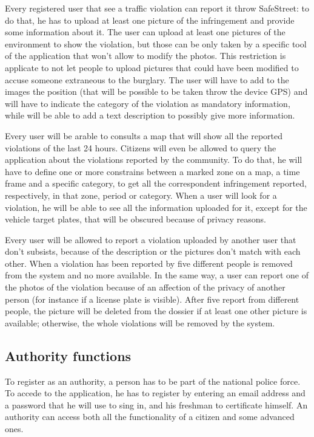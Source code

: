 \documentclass[../RASD.tex]{subfiles}
\begin{document}
    Every registered user that see a traffic violation can report it throw SafeStreet: to do that, he has to upload at least one picture of the infringement and provide some information about it. The user can upload at least one pictures of the environment to show the violation, but those can be only taken by a specific tool of the application that won't allow to modify the photos. This restriction is applicate to not let people to upload pictures that could have been modified to accuse someone extraneous to the burglary. The user will have to add to the images the position (that will be possible to be taken throw the device GPS) and will have to indicate the category of the violation as mandatory information, while will be able to add a text description to possibly give more information.

    Every user will be arable to consults a map that will show all the reported violations of the last 24 hours. Citizens will even be allowed to query the application about the violations reported by the community. To do that, he will have to define one or more constrains between a marked zone on a map, a time frame and a specific category, to get all the correspondent infringement reported, respectively, in that zone, period or category. When a user will look for a violation, he will be able to see all the information uploaded for it, except for the vehicle target plates, that will be obscured because of privacy reasons.

    Every user will be allowed to report a violation uploaded by another user that don’t subsists, because of the description or the pictures don’t match with each other. When a violation has been reported by five different people is removed from the system and no more available. In the same way, a user can report one of the photos of the violation because of an affection of the privacy of another person (for instance if a license plate is visible). After five report from different people, the picture will be deleted from the dossier if at least one other picture is available; otherwise, the whole violations will be removed by the system.
    \subsection{Authority functions}\label{subsec:authority-functions}
    To register as an authority, a person has to be part of the national police force. To accede to the application, he has to register by entering an email address and a password that he will use to sing in, and his freshman to certificate himself. An authority can access both all the functionality of a citizen and some advanced ones.
\end{document}
